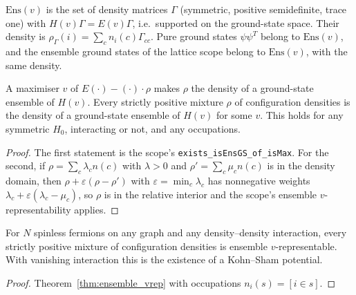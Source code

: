 \begin{definition}
  \label{def:Ens}
  \leanok
  $\mathrm{Ens}(v)$ is the set of density matrices $\Gamma$ (symmetric, positive semidefinite, trace one)
  with $H(v)\Gamma=E(v)\Gamma$, i.e.\ supported on the ground-state space. Their density is
  $\rho_\Gamma(i)=\sum_cn_i(c)\Gamma_{cc}$. Pure ground states $\psi\psi^T$ belong to $\mathrm{Ens}(v)$, and the ensemble
  ground states of the lattice scope belong to $\mathrm{Ens}(v)$, with the same density.
\end{definition}

\begin{theorem}
  \label{thm:ensemble_vrep}
  \leanok
  A maximiser $v$ of $E(\cdot)-(\cdot)\cdot\rho$ makes $\rho$ the density of a ground-state ensemble of $H(v)$. Every strictly
  positive mixture $\rho$ of configuration densities is the density of a ground-state ensemble of $H(v)$ for some $v$. This
  holds for any symmetric $H_0$, interacting or not, and any occupations.
\end{theorem}
\begin{proof}
  \leanok
  The first statement is the scope's \texttt{exists\_isEnsGS\_of\_isMax}. For the second, if $\rho=\sum_c\lambda_cn(c)$ with
  $\lambda>0$ and $\rho'=\sum_c\mu_cn(c)$ is in the density domain, then $\rho+\varepsilon(\rho-\rho')$ with $\varepsilon=\min_c\lambda_c$ has
  nonnegative weights $\lambda_c+\varepsilon(\lambda_c-\mu_c)$, so $\rho$ is in the relative interior and the scope's ensemble
  $v$-representability applies.
\end{proof}

\begin{theorem}
  \label{thm:ks_potential_exists}
  \leanok
  For $N$ spinless fermions on any graph and any density--density interaction, every strictly
  positive mixture of configuration densities is ensemble $v$-representable. With vanishing interaction this
  is the existence of a Kohn--Sham potential.
\end{theorem}
\begin{proof}
  \leanok
  Theorem~\ref{thm:ensemble_vrep} with occupations $n_i(s)=[i\in s]$.
\end{proof}

